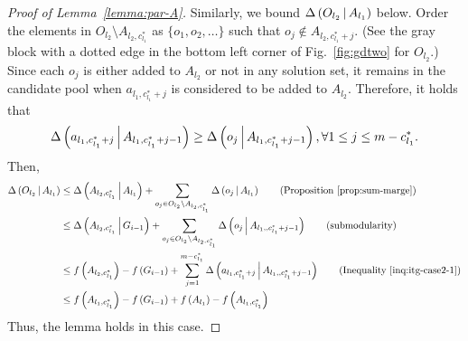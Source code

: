 \begin{proof}[Proof of Lemma~\ref{lemma:par-A}]
Similarly, we bound $\Delta \left( O_{l_2} \, \middle| \, A_{l_1} \right)$ below.
Order the elements in $O_{l_2}\setminus A_{l_2, c_{l_1}^*}$ as $\{o_1, o_2, \ldots\}$
such that $o_j \not \in A_{l_2, c_{l_1}^* + j}$.
(See the gray block with a dotted edge in the bottom left corner of Fig.~\ref{fig:gdtwo} for $O_{l_2}$.)
Since each $o_j$ is either added to $A_{l_2}$ or not in any solution set,
it remains in the candidate pool when $a_{l_1, c_{l_1}^*+j}$ is considered to be added to $A_{l_2}$.
Therefore, it holds that
\begin{equation}\label{inq:itg-case2-2}
\Delta \left( a_{l_1, c_{l_1}^*+j} \, \middle| \, A_{l_1, c_{l_1}^*+j-1} \right) \ge \Delta \left( o_j \, \middle| \, A_{l_1, c_{l_1}^*+j-1} \right), \forall 1\le j\le m-c_{l_1}^*.
\end{equation}
Then,
\begin{align*}
\marge{O_{l_2}}{A_{l_1}} &\le \marge{A_{l_2, c_{l_1}^*}}{A_{l_1}}  + \sum_{o_j \in O_{l_2}\setminus A_{l_2, c_{l_1}^*}}\marge{o_j}{A_{l_1}} \tag{Proposition~\ref{prop:sum-marge}}\\
&\le \marge{A_{l_2, c_{l_1}^*}}{G_{i-1}} + \sum_{o_j \in O_{l_2}\setminus A_{l_2, c_{l_1}^*}}\marge{o_j}{A_{l_1, , c_{l_1}^*+j-1}} \tag{submodularity}\\
&\le \ff{A_{l_2, c_{l_1}^*}}-\ff{G_{i-1}} + \sum_{j = 1}^{m-c_{l_1}^*}\marge{a_{l_1, c_{l_1}^*+j}}{A_{l_1, , c_{l_1}^*+j-1}} \tag{Inequality~\eqref{inq:itg-case2-1}}\\
& \le \ff{A_{l_1, c_{l_1}^*}}-\ff{G_{i-1}} + \ff{A_{l_1}} - \ff{A_{l_1, c_{l_1}^*}} 
\end{align*}
Thus, the lemma holds in this case.


\end{proof}
